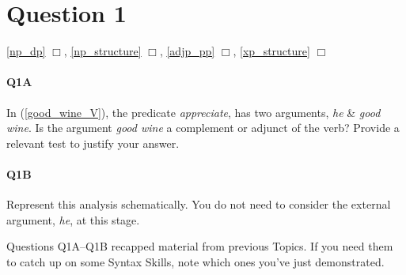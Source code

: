 \documentclass{article}
\begin{document}
\maketitle
\subtitle{Tutorial Notes Week 7: Topics 7, 8 \& 9}

\section*{Question 1}%
\hfill{} \ref{np_dp} $\Box$,
\ref{np_structure} $\Box$,
\ref{adjp_pp} $\Box$,
\ref{xp_structure} $\Box$%

\paragraph{Q1A} In (\ref{good_wine_V}), the predicate \emph{appreciate}, has two arguments, \emph{he} \& \emph{good wine}.
Is the argument \emph{good wine} a complement or adjunct of the verb?
Provide a relevant test to justify your answer.
\paragraph{Q1B} Represent this analysis schematically. You do not need to consider the external argument, \emph{he}, at this stage.

\begin{exe}
    \label{good_wine}
\end{exe}

Questions Q1A--Q1B recapped material from previous Topics. If you need them to catch up on some Syntax Skills, note which ones you've just demonstrated.
\end{document}
